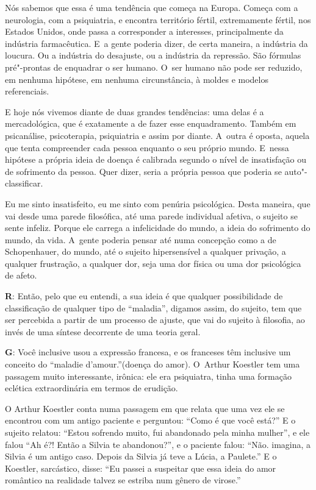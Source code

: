  

Nós sabemos que essa é uma tendência que começa na Europa. Começa com a
neurologia, com a psiquiatria, e encontra território fértil,
extremamente fértil, nos Estados Unidos, onde passa a corresponder a
interesses, principalmente da indústria farmacêutica. E~a gente poderia
dizer, de certa maneira, a indústria da loucura. Ou a indústria do
desajuste, ou a indústria da repressão. São fórmulas pré"-prontas de
enquadrar o ser humano. O~ser humano não pode ser reduzido, em nenhuma
hipótese, em nenhuma circunstância, à moldes e modelos referenciais.

 

E hoje nós vivemos diante de duas grandes tendências: uma delas é a
mercadológica, que é exatamente a de fazer esse enquadramento. Também em
psicanálise, psicoterapia, psiquiatria e assim por diante. A~outra é
oposta, aquela que tenta compreender cada pessoa enquanto o seu próprio
mundo. E~nessa hipótese a própria ideia de doença é calibrada segundo o
nível de insatisfação ou de sofrimento da pessoa. Quer dizer, seria a
própria pessoa que poderia se auto"-classificar.

 

Eu me sinto insatisfeito, eu me sinto com penúria psicológica. Desta
maneira, que vai desde uma parede filosófica, até uma parede individual
afetiva, o sujeito se sente infeliz. Porque ele carrega a infelicidade
do mundo, a ideia do sofrimento do mundo, da vida. A~gente poderia
pensar até numa concepção como a de Schopenhauer, do mundo, até o
sujeito hipersensível a qualquer privação, a qualquer frustração, a
qualquer dor, seja uma dor física ou uma dor psicológica de afeto.

 

\textbf{R}: Então, pelo que eu entendi, a sua ideia é que qualquer
possibilidade de classificação de qualquer tipo de ``maladia'', digamos
assim, do sujeito, tem que ser percebida a partir de um processo de
ajuste, que vai do sujeito à filosofia, ao invés de uma síntese
decorrente de uma teoria geral.

 

\textbf{G}: Você inclusive usou a expressão francesa, e os franceses têm
inclusive um conceito do ``maladie d'amour.''(doença do amor). O~Arthur
Koestler tem uma passagem muito interessante, irônica: ele era
psiquiatra, tinha uma formação eclética extraordinária em termos de
erudição.

O Arthur Koestler conta numa passagem em que relata que uma vez ele se
encontrou com um antigo paciente e perguntou: ``Como é que você está?''
E o sujeito relatou: ``Estou sofrendo muito, fui abandonado pela minha
mulher'', e ele falou ``Ah é?! Então a Silvia te abandonou?'', e o paciente
falou: ``Não. imagina, a Silvia é um antigo caso. Depois da Silvia já
teve a Lúcia, a Paulete.'' E o Koestler, sarcástico, disse: ``Eu passei a
suspeitar que essa ideia do amor romântico na realidade talvez se
estriba num gênero de virose.''

